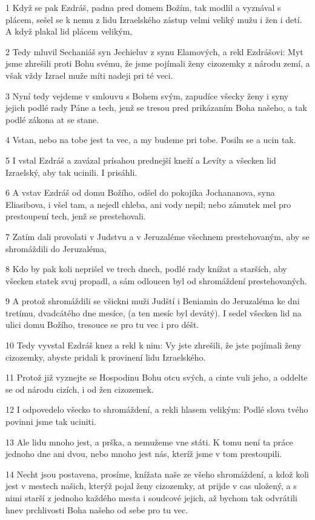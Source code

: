 \par 1 Když se pak Ezdráš, padna pred domem Božím, tak modlil a vyznával s plácem, sešel se k nemu z lidu Izraelského zástup velmi veliký mužu i žen i detí. A když plakal lid plácem velikým,
\par 2 Tedy mluvil Sechaniáš syn Jechieluv z synu Elamových, a rekl Ezdrášovi: Myt jsme zhrešili proti Bohu svému, že jsme pojímali ženy cizozemky z národu zemí, a však vždy Izrael muže míti nadeji pri té veci.
\par 3 Nyní tedy vejdeme v smlouvu s Bohem svým, zapudíce všecky ženy i syny jejich podlé rady Páne a tech, jenž se tresou pred prikázaním Boha našeho, a tak podlé zákona at se stane.
\par 4 Vstan, nebo na tobe jest ta vec, a my budeme pri tobe. Posiln se a ucin tak.
\par 5 I vstal Ezdráš a zavázal prísahou prednejší kneží a Levíty a všecken lid Izraelský, aby tak ucinili. I prisáhli.
\par 6 A vstav Ezdráš od domu Božího, odšel do pokojíka Jochananova, syna Eliasibova, i všel tam, a nejedl chleba, ani vody nepil; nebo zámutek mel pro prestoupení tech, jenž se prestehovali.
\par 7 Zatím dali provolati v Judstvu a v Jeruzaléme všechnem prestehovaným, aby se shromáždili do Jeruzaléma,
\par 8 Kdo by pak koli neprišel ve trech dnech, podlé rady knížat a starších, aby všecken statek svuj propadl, a sám odloucen byl od shromáždení prestehovaných.
\par 9 A protož shromáždili se všickni muži Judští i Beniamin do Jeruzaléma ke dni tretímu, dvadcátého dne mesíce, (a ten mesíc byl devátý). I sedel všecken lid na ulici domu Božího, tresouce se pro tu vec i pro déšt.
\par 10 Tedy vyvstal Ezdráš knez a rekl k nim: Vy jste zhrešili, že jste pojímali ženy cizozemky, abyste pridali k provinení lidu Izraelského.
\par 11 Protož již vyznejte se Hospodinu Bohu otcu svých, a cinte vuli jeho, a oddelte se od národu cizích, i od žen cizozemek.
\par 12 I odpovedelo všecko to shromáždení, a rekli hlasem velikým: Podlé slova tvého povinni jsme tak uciniti.
\par 13 Ale lidu mnoho jest, a prška, a nemužeme vne státi. K tomu není ta práce jednoho dne ani dvou, nebo mnoho jest nás, kteríž jsme v tom prestoupili.
\par 14 Necht jsou postavena, prosíme, knížata naše ze všeho shromáždení, a kdož koli jest v mestech našich, kterýž pojal ženy cizozemky, at prijde v cas uložený, a s nimi starší z jednoho každého mesta i soudcové jejich, až bychom tak odvrátili hnev prchlivosti Boha našeho od sebe pro tu vec.
